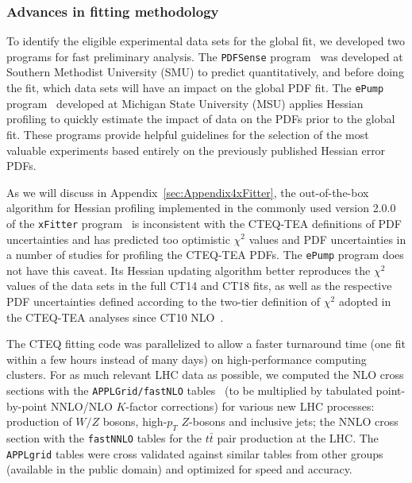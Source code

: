 \subsubsection{Advances in fitting methodology \label{sec:Advances} }
To identify the eligible experimental
data sets for the global fit, we developed two programs for fast preliminary analysis. The \texttt{PDFSense} program~\cite{Wang:2018heo} 
was developed at Southern Methodist University (SMU)
to predict quantitatively, and before doing the fit, which data sets
will have an impact on the global PDF fit. The \texttt{ePump} program~\cite{Schmidt:2018hvu} 
developed at Michigan State University (MSU)
applies Hessian profiling to quickly estimate the impact of data on the
PDFs prior to the global fit. These programs provide helpful guidelines
for the selection of the most valuable experiments based entirely on the previously published Hessian error PDFs.

 As we will discuss in Appendix~\ref{sec:Appendix4xFitter}, the out-of-the-box algorithm for Hessian profiling implemented in the 
 commonly used version 2.0.0 of the \texttt{xFitter} program~\cite{Bertone:2016ywq} is inconsistent with the CTEQ-TEA definitions 
 of PDF uncertainties and has predicted  too optimistic $\chi^2$ values and PDF uncertainties in a number 
 of studies for profiling the CTEQ-TEA PDFs. The \texttt{ePump} program does not have this caveat. 
 Its Hessian updating algorithm better reproduces the $\chi^2$ values of the data sets in the full CT14 and CT18 fits, 
 as well as the respective PDF uncertainties defined according to the two-tier definition of $\chi^2$ adopted in the CTEQ-TEA analyses since CT10 NLO~\cite{CT10NNLO}. 

The CTEQ fitting code was parallelized to allow a faster turnaround
time (one fit within a few hours instead of many days) on high-performance
computing clusters. For as much relevant LHC data as possible, we computed
the NLO cross sections with the \texttt{APPLGrid/fastNLO} tables~\cite{Kluge:2006xs,Carli:2010rw}  (to be multiplied by tabulated point-by-point NNLO/NLO $K$-factor corrections)
for various new LHC processes: production of $W/Z$ bosons, high-$p_{T}$
$Z$-bosons and inclusive jets; the NNLO cross section with the \texttt{fastNNLO} tables \cite{Czakon:2017dip,fastnnlo:grids} for the $t\bar{t}$ pair production at the LHC. The \texttt{APPLgrid} tables were cross validated
against similar tables from other groups (available in the public
domain) and optimized for speed and accuracy. 

